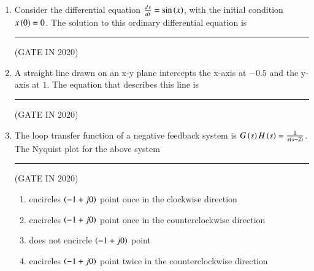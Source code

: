 \documentclass[journal,12pt,onecolumn]{IEEEtran}
\theoremstyle{remark}
\begin{document}
\begin{enumerate}
\item Consider the differential equation $\frac{dx}{dt} = \sin\left(x\right)$, with the initial condition $x\left(0\right) = 0$. The solution to this ordinary differential equation is \rule{2cm}{0.4pt}

\hfill{(GATE IN 2020)}
\begin{enumerate}
\end{enumerate}

\item A straight line drawn on an x-y plane intercepts the x-axis at $-0.5$ and the y-axis at $1$. The equation that describes this line is \rule{2cm}{0.4pt}

\hfill{(GATE IN 2020)}
\begin{enumerate}
\end{enumerate}

\item The loop transfer function of a negative feedback system is $G\left(s\right)H\left(s\right) = \frac{1}{s\left(s-2\right)}$. The Nyquist plot for the above system \rule{2cm}{0.4pt}

\hfill{(GATE IN 2020)}
\begin{enumerate}
\item encircles $\left(-1+ j0\right)$ point once in the clockwise direction
\item encircles $\left(-1+ j0\right)$ point once in the counterclockwise direction
\item does not encircle $\left(-1+j0\right)$ point
\item encircles $\left(-1+ j0\right)$ point twice in the counterclockwise direction
\end{enumerate}


\end{enumerate}
\end{document}
